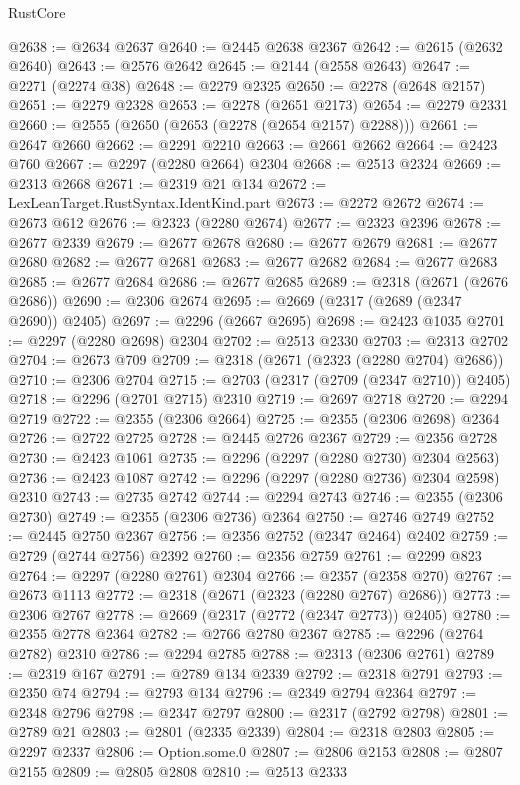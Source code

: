\begin{lexlean}{RustCore}
\begin{coremodule}
@2638 := @2634 @2637
@2640 := @2445 @2638 @2367
@2642 := @2615 (@2632 @2640)
@2643 := @2576 @2642
@2645 := @2144 (@2558 @2643)
@2647 := @2271 (@2274 @38)
@2648 := @2279 @2325
@2650 := @2278 (@2648 @2157)
@2651 := @2279 @2328
@2653 := @2278 (@2651 @2173)
@2654 := @2279 @2331
@2660 := @2555 (@2650 (@2653 (@2278 (@2654 @2157) @2288)))
@2661 := @2647 @2660
@2662 := @2291 @2210
@2663 := @2661 @2662
@2664 := @2423 @760
@2667 := @2297 (@2280 @2664) @2304
@2668 := @2513 @2324
@2669 := @2313 @2668
@2671 := @2319 @21 @134
@2672 := LexLeanTarget.RustSyntax.IdentKind.part
@2673 := @2272 @2672
@2674 := @2673 @612
@2676 := @2323 (@2280 @2674)
@2677 := @2323 @2396
@2678 := @2677 @2339
@2679 := @2677 @2678
@2680 := @2677 @2679
@2681 := @2677 @2680
@2682 := @2677 @2681
@2683 := @2677 @2682
@2684 := @2677 @2683
@2685 := @2677 @2684
@2686 := @2677 @2685
@2689 := @2318 (@2671 (@2676 @2686))
@2690 := @2306 @2674
@2695 := @2669 (@2317 (@2689 (@2347 @2690)) @2405)
@2697 := @2296 (@2667 @2695)
@2698 := @2423 @1035
@2701 := @2297 (@2280 @2698) @2304
@2702 := @2513 @2330
@2703 := @2313 @2702
@2704 := @2673 @709
@2709 := @2318 (@2671 (@2323 (@2280 @2704) @2686))
@2710 := @2306 @2704
@2715 := @2703 (@2317 (@2709 (@2347 @2710)) @2405)
@2718 := @2296 (@2701 @2715) @2310
@2719 := @2697 @2718
@2720 := @2294 @2719
@2722 := @2355 (@2306 @2664)
@2725 := @2355 (@2306 @2698) @2364
@2726 := @2722 @2725
@2728 := @2445 @2726 @2367
@2729 := @2356 @2728
@2730 := @2423 @1061
@2735 := @2296 (@2297 (@2280 @2730) @2304 @2563)
@2736 := @2423 @1087
@2742 := @2296 (@2297 (@2280 @2736) @2304 @2598) @2310
@2743 := @2735 @2742
@2744 := @2294 @2743
@2746 := @2355 (@2306 @2730)
@2749 := @2355 (@2306 @2736) @2364
@2750 := @2746 @2749
@2752 := @2445 @2750 @2367
@2756 := @2356 @2752 (@2347 @2464) @2402
@2759 := @2729 (@2744 @2756) @2392
@2760 := @2356 @2759
@2761 := @2299 @823
@2764 := @2297 (@2280 @2761) @2304
@2766 := @2357 (@2358 @270)
@2767 := @2673 @1113
@2772 := @2318 (@2671 (@2323 (@2280 @2767) @2686))
@2773 := @2306 @2767
@2778 := @2669 (@2317 (@2772 (@2347 @2773)) @2405)
@2780 := @2355 @2778 @2364
@2782 := @2766 @2780 @2367
@2785 := @2296 (@2764 @2782) @2310
@2786 := @2294 @2785
@2788 := @2313 (@2306 @2761)
@2789 := @2319 @167
@2791 := @2789 @134 @2339
@2792 := @2318 @2791
@2793 := @2350 @74
@2794 := @2793 @134
@2796 := @2349 @2794 @2364
@2797 := @2348 @2796
@2798 := @2347 @2797
@2800 := @2317 (@2792 @2798)
@2801 := @2789 @21
@2803 := @2801 (@2335 @2339)
@2804 := @2318 @2803
@2805 := @2297 @2337
@2806 := Option.some.{0}
@2807 := @2806 @2153
@2808 := @2807 @2155
@2809 := @2805 @2808
@2810 := @2513 @2333

\end{coremodule}
\end{lexlean}
